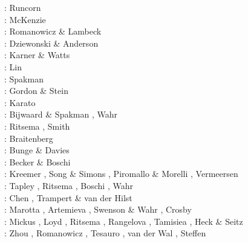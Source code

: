 
\begin{scriptsize}
\nineteensixtyfour: Runcorn \cite{runc64}\\
\nineteensixtyseven: McKenzie \cite{mcke67}\\
\nineteenseventyseven: Romanowicz \& Lambeck \cite{rola77}\\
\nineteeneightyone: Dziewonski \& Anderson \cite{dzan81}\\
\nineteeneightythree: Karner \& Watts \cite{kawa83}\\
\nineteenninety: Lin \etal \cite{lips90}\\
\nineteenninetyone: Spakman \cite{spak91}\\
\nineteenninetytwo: Gordon \& Stein \cite{gost92}\\
\nineteenninetythree: Karato \cite{kara93}\\
\nineteenninetyeight: Bijwaard \& Spakman \cite{bisp98}, Wahr \etal \cite{wamb98}\\
\nineteenninetynine: Ritsema \etal \cite{rivw99}, Smith \etal \cite{smst99} \\
\twothousand: Braitenberg \etal \cite{brzf00}\\
\twothousandone: Bunge \& Davies \cite{buda01}\\
\twothousandtwo: Becker \& Boschi \cite{bebo02}\\
\twothousandthree: Kreemer \etal \cite{krhh03}, Song \& Simons \cite{sosi03}, 
                   Piromallo \& Morelli \cite{pimo03}, Vermeersen \cite{verm03}\\
\twothousandfour: Tapley \etal \cite{tabr04}, Ritsema \etal \cite{rivw04}, Boschi \etal \cite{boek04},
                  Wahr \etal \cite{wasz04}\\
\twothousandfive: Chen \etal \cite{chrw05}, Trampert \& van der Hilst \cite{trva05}\\
\twothousandsix: Marotta \etal \cite{masr06}, Artemieva \cite{arte06}, 
                 Swenson \& Wahr \cite{swwa06}, Crosby \etal \cite{crms06}\\
\twothousandseven: Mickus \etal \cite{mitk07}, Loyd \etal \cite{lobc07}, Ritsema \etal \cite{rimb07}, 
                   Rangelova \etal \cite{ravb07}, Tamisiea \etal \cite{tamd07}, 
                   Heck \& Seitz \cite{hese07}\\
\twothousandeight: Zhou \cite{zhou08}, Romanowicz \cite{roma08}, 
                   Tesauro \etal \cite{tekc08}, van der Wal \cite{vaws08}, 
                   Steffen \etal \cite{stdm08}\\

\end{scriptsize}
